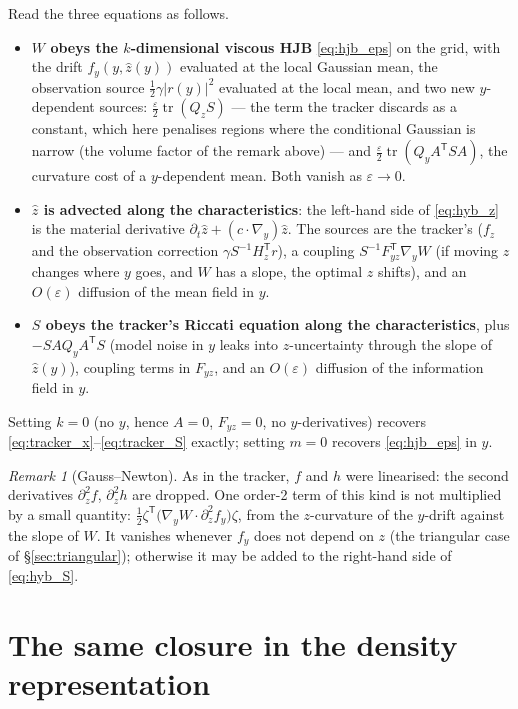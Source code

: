 \documentclass[11pt,a4paper]{article}
\newcommand{\tr}{\operatorname{tr}}
\newcommand{\T}{^{\mathsf T}}
\newcommand{\zh}{\hat{z}}
\newcommand{\eps}{\varepsilon}
\newcommand{\abs}[1]{\left\lvert #1 \right\rvert}
\newcommand{\gy}{\nabla_{\!y}}
\theoremstyle{plain}
\theoremstyle{definition}
\theoremstyle{remark}
\newtheorem{remark}{Remark}
\begin{document}
Read the three equations as follows.
\begin{itemize}[leftmargin=1.5em]
  \item \textbf{$W$ obeys the $k$-dimensional viscous HJB} \eqref{eq:hjb_eps} on the grid, with the drift $f_y(y,\zh(y))$ evaluated at the local Gaussian mean, the observation source $\tfrac12\gamma\abs{r(y)}^2$ evaluated at the local mean, and two new $y$-dependent sources: $\tfrac{\eps}{2}\tr(Q_zS)$ --- the term the tracker discards as a constant, which here penalises regions where the conditional Gaussian is narrow (the volume factor of the remark above) --- and $\tfrac{\eps}{2}\tr(Q_yA\T SA)$, the curvature cost of a $y$-dependent mean. Both vanish as $\eps\to0$.
  \item \textbf{$\zh$ is advected along the characteristics}: the left-hand side of \eqref{eq:hyb_z} is the material derivative $\partial_t\zh + (c\cdot\gy)\zh$. The sources are the tracker's ($f_z$ and the observation correction $\gamma S^{-1}H_z\T r$), a coupling $S^{-1}F_{yz}\T\gy W$ (if moving $z$ changes where $y$ goes, and $W$ has a slope, the optimal $z$ shifts), and an $O(\eps)$ diffusion of the mean field in $y$.
  \item \textbf{$S$ obeys the tracker's Riccati equation along the characteristics}, plus $-SAQ_yA\T S$ (model noise in $y$ leaks into $z$-uncertainty through the slope of $\zh(y)$), coupling terms in $F_{yz}$, and an $O(\eps)$ diffusion of the information field in $y$.
\end{itemize}
Setting $k=0$ (no $y$, hence $A=0$, $F_{yz}=0$, no $y$-derivatives) recovers \eqref{eq:tracker_x}--\eqref{eq:tracker_S} exactly; setting $m=0$ recovers \eqref{eq:hjb_eps} in $y$.

\begin{remark}[Gauss--Newton]
As in the tracker, $f$ and $h$ were linearised: the second derivatives $\partial_z^2 f$, $\partial_z^2 h$ are dropped. One order-2 term of this kind is not multiplied by a small quantity: $\tfrac12\zeta\T\big(\gy W\cdot\partial_z^2 f_y\big)\zeta$, from the $z$-curvature of the $y$-drift against the slope of $W$. It vanishes whenever $f_y$ does not depend on $z$ (the triangular case of \S\ref{sec:triangular}); otherwise it may be added to the right-hand side of \eqref{eq:hyb_S}.
\end{remark}

\section{The same closure in the density representation}
\label{sec:density}
\end{document}

